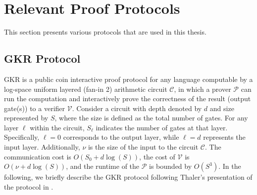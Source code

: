 %
%

\section{Relevant Proof Protocols}
This section presents various  protocols that are used in this thesis. 
\subsection{GKR Protocol} \label{gkr}
GKR \cite{GKR2008} is a public coin interactive proof protocol for any language computable by a log-space uniform layered (fan-in 2) arithmetic circuit $\mathcal{C}$, in which a prover $\mathcal{P}$ can run the computation and interactively prove the correctness of the result (output gate(s)) to a verifier $\mathcal{V}$. Consider a circuit with depth denoted by $d$ and size represented by $S$, where the size is defined as the total number of gates. For any layer $\ell$ within the circuit, $S_\ell$ indicates the number of gates at that layer. Specifically, $\ell=0$ corresponds to the output layer, while $\ell=d$ represents the input layer. Additionally, $\nu$ is the size of the input to  the circuit $\mathcal{C}$. The communication cost is $O(S_0 + d\log(S))$, the cost of $\mathcal{V}$  is $O(\nu + d\log(S))$, and the runtime of the $\mathcal{P}$ is bounded by $O(S^3)$. In the following, we briefly describe the GKR protocol following Thaler's presentation of the protocol in \cite{Thaler2022Proofs}.\\


